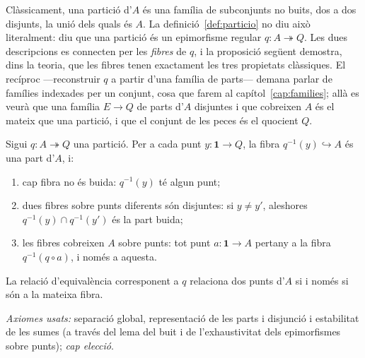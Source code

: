 \begin{observacio}\label{obs:particio-classica}
Clàssicament, una partició d'\(A\) és una família de subconjunts no buits, dos a dos disjunts, la unió dels quals és \(A\). La definició~\ref{def:particio} no diu això literalment: diu que una partició és un epimorfisme regular \(q\colon A\twoheadrightarrow Q\). Les dues descripcions es connecten per les \emph{fibres} de \(q\), i la proposició següent demostra, dins la teoria, que les fibres tenen exactament les tres propietats clàssiques. El recíproc ---reconstruir \(q\) a partir d'una família de parts--- demana parlar de famílies indexades per un conjunt, cosa que farem al capítol~\ref{cap:families}; allà es veurà que una família \(E\to Q\) de parts d'\(A\) disjuntes i que cobreixen \(A\) és el mateix que una partició, i que el conjunt de les peces és el quocient \(Q\).
\end{observacio}

\begin{proposicio}\label{prop:fibres-particio}
Sigui \(q\colon A\twoheadrightarrow Q\) una partició. Per a cada punt \(y\colon\mathbf1\to Q\), la fibra \(q^{-1}(y)\hookrightarrow A\) és una part d'\(A\), i:
\begin{enumerate}
\item cap fibra no és buida: \(q^{-1}(y)\) té algun punt;
\item dues fibres sobre punts diferents són disjuntes: si \(y\ne y'\), aleshores \(q^{-1}(y)\cap q^{-1}(y')\) és la part buida;
\item les fibres cobreixen \(A\) sobre punts: tot punt \(a\colon\mathbf1\to A\) pertany a la fibra \(q^{-1}(q\circ a)\), i només a aquesta.
\end{enumerate}
La relació d'equivalència corresponent a \(q\) relaciona dos punts d'\(A\) si i només si són a la mateixa fibra.\par
\emph{Axiomes usats:} separació global, representació de les parts i disjunció i estabilitat de les sumes (a través del lema del buit i de l'exhaustivitat dels epimorfismes sobre punts); \emph{cap elecció}.
\end{proposicio}

